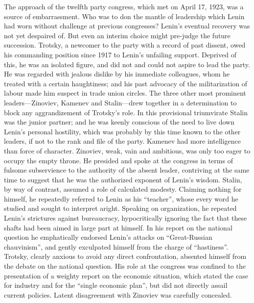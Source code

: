 The approach of the twelfth party congress, which met on April 17, 1923, was a source of embarrassment. Who was to don the mantle of leadership which Lenin had worn without challenge at previous congresses? Lenin's eventual recovery was not yet despaired of. But even an interim choice might pre-judge the future succession. Trotsky, a newcomer to the party with a record of past dissent, owed his commanding position since 1917 to Lenin's unfailing support. Deprived of this, he was an isolated figure, and did not and could not aspire to lead the party. He was regarded with jealous dislike by his immediate colleagues, whom he treated with a certain haughtiness; and his past advocacy of the militarization of labour made him suspect in trade union circles. The three other most prominent leaders---Zinoviev, Kamenev and Stalin---drew together in a determination to block any aggrandizement of Trotsky's role. In this provisional triumvirate Stalin was the junior partner; and he was keenly conscious of the need to live down Lenin's personal hostility, which was probably by this time known to the other leaders, if not to the rank and file of the party. Kamenev had more intelligence than force of character. Zinoviev, weak, vain and ambitious, was only too eager to occupy the empty throne. He presided and spoke at the congress in terms of fulsome subservience to the authority of the absent leader, contriving at the same time to suggest that he was the authorized exponent of Lenin's wisdom. Stalin, by way of contrast, assumed a role of calculated modesty. Claiming nothing for himself, he repeatedly referred to Lenin as his ``teacher'', whose every word he studied and sought to interpret aright. Speaking on organization, he repeated Lenin's strictures against bureaucracy, hypocritically ignoring the fact that these shafts had been aimed in large part at himself. In his report on the national question he emphatically endorsed Lenin's attacks on ``Great-Russian chauvinism'', and gently exculpated himself from the charge of ``hastiness''. Trotsky, clearly anxious to avoid any direct confrontation, absented himself from the debate on the national question. His role at the congress was confined to the presentation of a weighty report on the economic situation, which stated the case for industry and for the ``single economic plan'', but did not directly assail current policies. Latent disagreement with Zinoviev was carefully concealed. 

